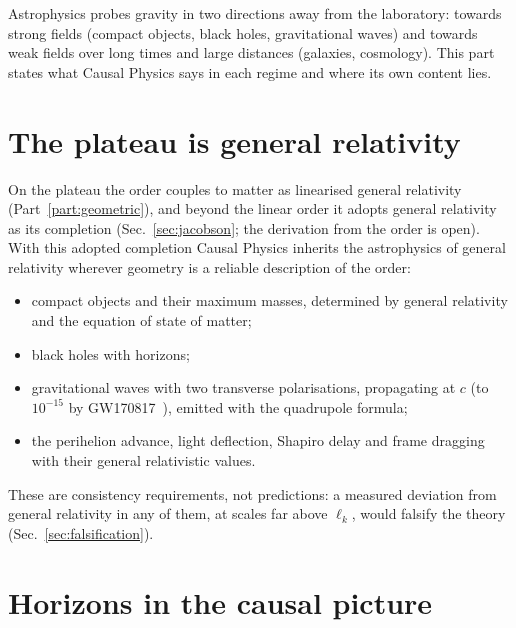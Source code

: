 
Astrophysics probes gravity in two directions away from the laboratory: towards strong fields
(compact objects, black holes, gravitational waves) and towards weak fields over long times and large
distances (galaxies, cosmology). This part states what Causal Physics says in each regime and where
its own content lies.

\section{The plateau is general relativity}\label{sec:astro-plateau}

On the plateau the order couples to matter as linearised general relativity
(Part~\ref{part:geometric}), and beyond the linear order it adopts general relativity as its completion
(Sec.~\ref{sec:jacobson}; the derivation from the order is open). With this adopted completion Causal Physics
inherits the astrophysics of general relativity wherever geometry is a reliable description of the order:
\begin{itemize}
\item compact objects and their maximum masses, determined by general relativity and the equation of
  state of matter;
\item black holes with horizons;
\item gravitational waves with two transverse polarisations, propagating at $c$ (to $10^{-15}$ by
  GW170817~\cite{Abbott2017GW}), emitted with the quadrupole formula;
\item the perihelion advance, light deflection, Shapiro delay and frame dragging with their general
  relativistic values.
\end{itemize}
These are consistency requirements, not predictions: a measured deviation from general relativity in any
of them, at scales far above $\ell_k$, would falsify the theory (Sec.~\ref{sec:falsification}).

\section{Horizons in the causal picture}\label{sec:astro-horizons}

